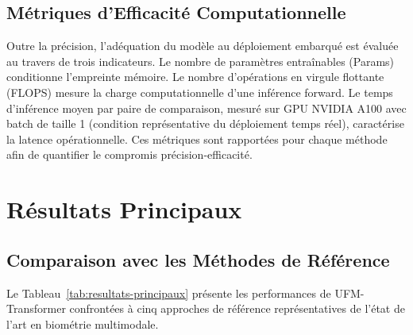 \documentclass[12pt,a4paper]{report}
\begin{document}
\subsection{M\'{e}triques d'Efficacit\'{e} Computationnelle}

Outre la pr\'{e}cision, l'ad\'{e}quation du mod\`{e}le au d\'{e}ploiement embarqu\'{e} est \'{e}valu\'{e}e au travers de trois indicateurs. Le nombre de param\`{e}tres entra\^{i}nables (Params) conditionne l'empreinte m\'{e}moire. Le nombre d'op\'{e}rations en virgule flottante (FLOPS) mesure la charge computationnelle d'une inf\'{e}rence forward. Le temps d'inf\'{e}rence moyen par paire de comparaison, mesur\'{e} sur GPU NVIDIA A100 avec batch de taille 1 (condition repr\'{e}sentative du d\'{e}ploiement temps r\'{e}el), caract\'{e}rise la latence op\'{e}rationnelle. Ces m\'{e}triques sont rapport\'{e}es pour chaque m\'{e}thode afin de quantifier le compromis pr\'{e}cision-ef\-fi\-ca\-cit\'{e}.

\section{R\'{e}sultats Principaux}
\label{sec:resultats-principaux}

\subsection{Comparaison avec les M\'{e}thodes de R\'{e}f\'{e}rence}

Le Tableau~\ref{tab:resultats-principaux} pr\'{e}sente les performances de UFM-Transformer confront\'{e}es \`{a} cinq approches de r\'{e}f\'{e}rence repr\'{e}sentatives de l'\'{e}tat de l'art en biom\'{e}trie multimodale.
\end{document}
